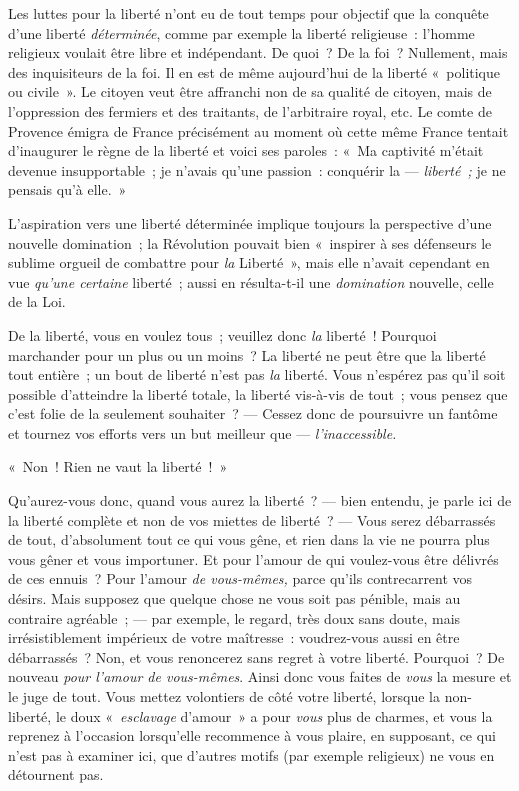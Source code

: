 \documentclass[french,twoside]{book} %
\begin{document}
Les luttes pour la liberté n’ont eu de tout temps pour objectif que la conquête d’une liberté \emph{déterminée}, comme par exemple la liberté religieuse : l’homme religieux voulait être libre et indépendant. De quoi ? De la foi ? Nullement, mais des inquisiteurs de la foi.  Il en est de même aujourd’hui de la liberté « politique ou civile ». Le citoyen veut être affranchi non de sa qualité de citoyen, mais de l’oppression des fermiers et des traitants, de l’arbitraire royal, etc. Le comte de Provence émigra de France précisément au moment où cette même France tentait d’inaugurer le règne de la liberté et voici ses paroles : « Ma captivité m’était devenue insupportable ; je n’avais qu’une passion : conquérir la — \emph{liberté ;} je ne pensais qu’à elle. »\par
L’aspiration vers une liberté déterminée implique toujours la perspective d’une nouvelle domination ; la Révolution pouvait bien « inspirer à ses défenseurs le sublime orgueil de combattre pour \emph{la} Liberté », mais elle n’avait cependant en vue \emph{qu’une certaine} liberté ; aussi en résulta-t-il une \emph{domination} nouvelle, celle de la Loi.\par
De la liberté, vous en voulez tous ; veuillez donc \emph{la }liberté ! Pourquoi marchander pour un plus ou un moins ? La liberté ne peut être que la liberté tout entière ; un bout de liberté n’est pas \emph{la} liberté. Vous n’espérez pas qu’il soit possible d’atteindre la liberté totale, la liberté vis-à-vis de tout ; vous pensez que c’est folie de la seulement souhaiter ? — Cessez donc de poursuivre un fantôme et tournez vos efforts vers un but meilleur que — \emph{l’inaccessible.}\par
« Non ! Rien ne vaut la liberté ! »\par
Qu’aurez-vous donc, quand vous aurez la liberté ? — bien entendu, je parle ici de la liberté complète et non de vos miettes de liberté ? — Vous serez débarrassés de tout, d’absolument tout ce qui vous gêne, et rien dans la vie ne pourra plus vous gêner et vous importuner. Et pour l’amour de qui voulez-vous être délivrés de ces ennuis ? Pour l’amour \emph{de vous-mêmes, }parce qu’ils contrecarrent vos désirs. Mais supposez que quelque chose ne vous soit pas pénible, mais au contraire agréable ; — par exemple, le regard, très doux sans doute, mais irrésistiblement impérieux  de votre maîtresse : voudrez-vous aussi en être débarrassés ? Non, et vous renoncerez sans regret à votre liberté. Pourquoi ? De nouveau \emph{pour l’amour de vous-mêmes}. Ainsi donc vous faites de \emph{vous} la mesure et le juge de tout. Vous mettez volontiers de côté votre liberté, lorsque la non-liberté, le doux « \emph{esclavage }d’amour » a pour \emph{vous} plus de charmes, et vous la reprenez à l’occasion lorsqu’elle recommence à vous plaire, en supposant, ce qui n’est pas à examiner ici, que d’autres motifs (par exemple religieux) ne vous en détournent pas.\par
\end{document}
